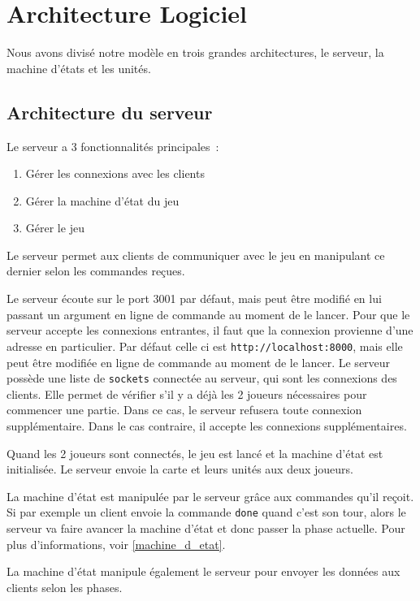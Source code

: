 
\section{Architecture Logiciel}

Nous avons divisé notre modèle en trois grandes architectures, le serveur, la machine d'états et les unités.

\subsection{Architecture du serveur}

Le serveur a 3 fonctionnalités principales :
\begin{enumerate}
    \item Gérer les connexions avec les clients
    \item Gérer la machine d'état du jeu
    \item Gérer le jeu
\end{enumerate}

Le serveur permet aux clients de communiquer avec le jeu en manipulant ce dernier selon les commandes reçues.

Le serveur écoute sur le port 3001 par défaut, mais peut être modifié en lui passant un argument en ligne de commande au moment de le lancer.
Pour que le serveur accepte les connexions entrantes, il faut que la connexion provienne d'une adresse en particulier. Par défaut celle ci est {\tt http://localhost:8000}, mais elle peut être modifiée en ligne de commande au moment de le lancer.
Le serveur possède une liste de {\tt sockets} connectée au serveur, qui sont les connexions des clients. Elle permet de vérifier s'il y a déjà les 2 joueurs nécessaires pour commencer une partie. Dans ce cas, le serveur refusera toute connexion supplémentaire. Dans le cas contraire, il accepte les connexions supplémentaires.

Quand les 2 joueurs sont connectés, le jeu est lancé et la machine d'état est initialisée. Le serveur envoie la carte et leurs unités aux deux joueurs.

La machine d'état est manipulée par le serveur grâce aux commandes qu'il reçoit. Si par exemple un client envoie la commande {\tt done} quand c'est son tour, alors le serveur va faire avancer la machine d'état et donc passer la phase actuelle.
Pour plus d'informations, voir \ref{machine_d_etat}.

La machine d'état manipule également le serveur pour envoyer les données aux clients selon les phases.


